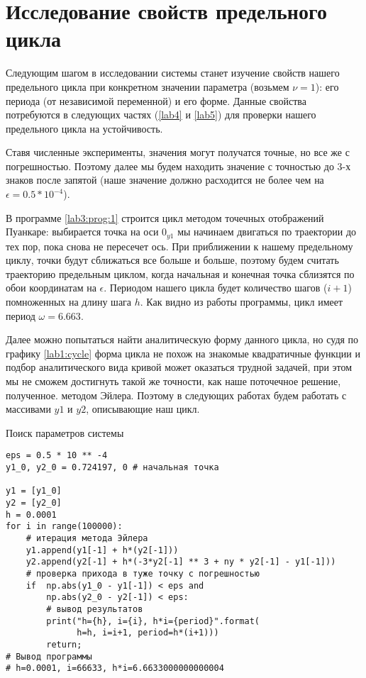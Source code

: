 \chapter{Исследование свойств предельного цикла}

Следующим шагом в исследовании системы станет изучение свойств нашего предельного цикла
при конкретном значении параметра (возьмем $\nu = 1$): его периода (от независимой переменной) и его форме.
Данные свойства потребуются в следующих частях (\ref{lab4} и \ref{lab5}) для проверки 
нашего предельного цикла на устойчивость.

Ставя численные эксперименты, значения могут получатся точные, но все же с погрешностью.
Поэтому далее мы будем находить значение с точностью до 3-х знаков после запятой
(наше значение должно расходится не более чем на $ \epsilon = 0.5 * 10 ^{-4}$).

В программе \ref{lab3:prog:1} строится цикл методом точечных отображений Пуанкаре:
выбирается точка на оси $0_{y1}$ мы начинаем двигаться по траектории до тех пор,
пока снова не пересечет ось. При приближении к нашему предельному циклу, точки будут 
сближаться все больше и больше, поэтому будем считать траекторию предельным циклом, когда
начальная и конечная точка сблизятся по обои координатам на $\epsilon$. Периодом нашего цикла
будет количество шагов ($i + 1$) помноженных на длину шага $h$. Как видно из работы
программы, цикл имеет период $\omega = 6.663$. 

Далее можно попытаться найти аналитическую форму данного цикла, но судя по графику \ref{lab1:cycle}
форма цикла не похож на знакомые квадратичные функции и подбор аналитического вида кривой может оказаться
трудной задачей, при этом мы не сможем достигнуть такой же точности, как наше поточечное решение, полученное.
методом Эйлера. Поэтому в следующих работах будем работать с массивами $y1$ и $y2$, описывающие наш цикл.

\begin{program}
    \caption{Поиск параметров системы}
    \label{lab3:prog:1}
    \begin{verbatim}
eps = 0.5 * 10 ** -4 
y1_0, y2_0 = 0.724197, 0 # начальная точка 

y1 = [y1_0]
y2 = [y2_0]
h = 0.0001
for i in range(100000):
    # итерация метода Эйлера
    y1.append(y1[-1] + h*(y2[-1]))
    y2.append(y2[-1] + h*(-3*y2[-1] ** 3 + ny * y2[-1] - y1[-1]))
    # проверка прихода в туже точку с погрешностью
    if  np.abs(y1_0 - y1[-1]) < eps and
        np.abs(y2_0 - y2[-1]) < eps:
        # вывод результатов
        print("h={h}, i={i}, h*i={period}".format(
              h=h, i=i+1, period=h*(i+1)))
        return;
# Вывод программы 
# h=0.0001, i=66633, h*i=6.6633000000000004
    \end{verbatim}
\end{program}


